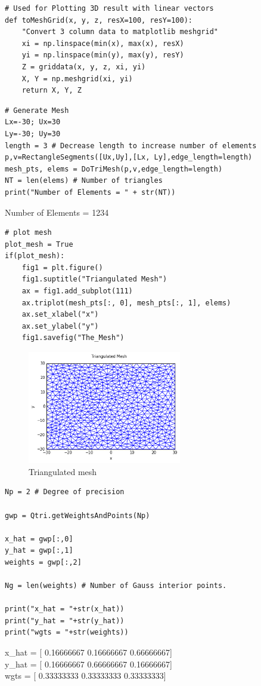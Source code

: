 \documentclass{uonmathreport}
\begin{document}
\begin{verbatim}
# Used for Plotting 3D result with linear vectors
def toMeshGrid(x, y, z, resX=100, resY=100):
	"Convert 3 column data to matplotlib meshgrid"
	xi = np.linspace(min(x), max(x), resX)
	yi = np.linspace(min(y), max(y), resY)
	Z = griddata(x, y, z, xi, yi)
	X, Y = np.meshgrid(xi, yi)
	return X, Y, Z
\end{verbatim}

\begin{verbatim}
# Generate Mesh
Lx=-30; Ux=30
Ly=-30; Uy=30
length = 3 # Decrease length to increase number of elements
p,v=RectangleSegments([Ux,Uy],[Lx, Ly],edge_length=length)
mesh_pts, elems = DoTriMesh(p,v,edge_length=length)
NT = len(elems) # Number of triangles
print("Number of Elements = " + str(NT))
\end{verbatim}
Number of Elements = 1234


\begin{verbatim}
# plot mesh
plot_mesh = True
if(plot_mesh):
	fig1 = plt.figure()
	fig1.suptitle("Triangulated Mesh")
	ax = fig1.add_subplot(111)
	ax.triplot(mesh_pts[:, 0], mesh_pts[:, 1], elems)
	ax.set_xlabel("x")
	ax.set_ylabel("y")
	fig1.savefig("The_Mesh")
\end{verbatim}

\begin{figure}[H]
	\centering
	\includegraphics[width=0.6\textwidth]{2dNystTriang_Main_files/2dNystTriang_Main_5_0.png}
	\caption{Triangulated mesh}
\end{figure}

\begin{verbatim}
Np = 2 # Degree of precision

gwp = Qtri.getWeightsAndPoints(Np)

x_hat = gwp[:,0]
y_hat = gwp[:,1]
weights = gwp[:,2]

Ng = len(weights) # Number of Gauss interior points.

print("x_hat = "+str(x_hat))
print("y_hat = "+str(y_hat))
print("wgts = "+str(weights))

\end{verbatim}
x\_hat = [ 0.16666667  0.16666667  0.66666667]\\
y\_hat = [ 0.16666667  0.66666667  0.16666667]\\
wgts = [ 0.33333333  0.33333333  0.33333333]
\end{document}
